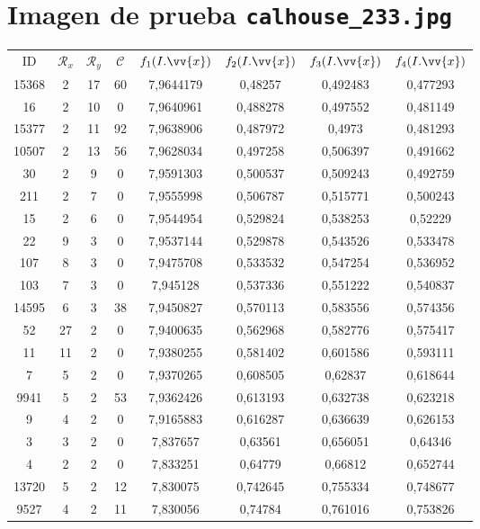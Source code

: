 \section{Imagen de prueba \texttt{calhouse\_233.jpg}}

\scriptsize
\begin{longtable}{|c|c|c|c|c|c|c|c|}
\hline
ID & $\mathscr{R}_x$ & $\mathscr{R}_y$ & $\mathscr{C}$ & $f_1(I.\vv{x})$ & $f_2(I.\vv{x})$ & $f_3(I.\vv{x})$ & $f_4(I.\vv{x})$ \\
15368 & 2 & 17 & 60 & 7,9644179 & 0,48257 & 0,492483 & 0,477293 \\
16 & 2 & 10 & 0 & 7,9640961 & 0,488278 & 0,497552 & 0,481149 \\
15377 & 2 & 11 & 92 & 7,9638906 & 0,487972 & 0,4973 & 0,481293 \\
10507 & 2 & 13 & 56 & 7,9628034 & 0,497258 & 0,506397 & 0,491662 \\
30 & 2 & 9 & 0 & 7,9591303 & 0,500537 & 0,509243 & 0,492759 \\
211 & 2 & 7 & 0 & 7,9555998 & 0,506787 & 0,515771 & 0,500243 \\
15 & 2 & 6 & 0 & 7,9544954 & 0,529824 & 0,538253 & 0,52229 \\
22 & 9 & 3 & 0 & 7,9537144 & 0,529878 & 0,543526 & 0,533478 \\
107 & 8 & 3 & 0 & 7,9475708 & 0,533532 & 0,547254 & 0,536952 \\
103 & 7 & 3 & 0 & 7,945128 & 0,537336 & 0,551222 & 0,540837 \\
14595 & 6 & 3 & 38 & 7,9450827 & 0,570113 & 0,583556 & 0,574356 \\
52 & 27 & 2 & 0 & 7,9400635 & 0,562968 & 0,582776 & 0,575417 \\
11 & 11 & 2 & 0 & 7,9380255 & 0,581402 & 0,601586 & 0,593111 \\
7 & 5 & 2 & 0 & 7,9370265 & 0,608505 & 0,62837 & 0,618644 \\
9941 & 5 & 2 & 53 & 7,9362426 & 0,613193 & 0,632738 & 0,623218 \\
9 & 4 & 2 & 0 & 7,9165883 & 0,616287 & 0,636639 & 0,626153 \\
3 & 3 & 2 & 0 & 7,837657 & 0,63561 & 0,656051 & 0,64346 \\
4 & 2 & 2 & 0 & 7,833251 & 0,64779 & 0,66812 & 0,652744 \\
13720 & 5 & 2 & 12 & 7,830075 & 0,742645 & 0,755334 & 0,748677 \\
9527 & 4 & 2 & 11 & 7,830056 & 0,74784 & 0,761016 & 0,753826 \\

\end{longtable}
